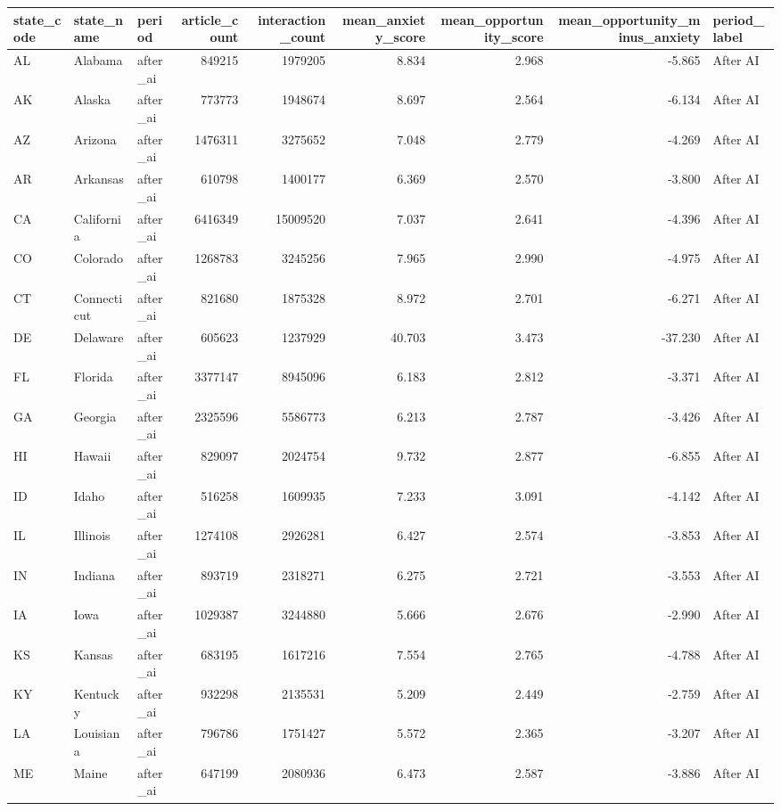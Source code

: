\begin{tabular}{lllrrrrrl}
\toprule
state\_code & state\_name & period & article\_count & interaction\_count & mean\_anxiety\_score & mean\_opportunity\_score & mean\_opportunity\_minus\_anxiety & period\_label \\
\midrule
AL & Alabama & after\_ai & 849215 & 1979205 & 8.834 & 2.968 & -5.865 & After AI \\
AK & Alaska & after\_ai & 773773 & 1948674 & 8.697 & 2.564 & -6.134 & After AI \\
AZ & Arizona & after\_ai & 1476311 & 3275652 & 7.048 & 2.779 & -4.269 & After AI \\
AR & Arkansas & after\_ai & 610798 & 1400177 & 6.369 & 2.570 & -3.800 & After AI \\
CA & California & after\_ai & 6416349 & 15009520 & 7.037 & 2.641 & -4.396 & After AI \\
CO & Colorado & after\_ai & 1268783 & 3245256 & 7.965 & 2.990 & -4.975 & After AI \\
CT & Connecticut & after\_ai & 821680 & 1875328 & 8.972 & 2.701 & -6.271 & After AI \\
DE & Delaware & after\_ai & 605623 & 1237929 & 40.703 & 3.473 & -37.230 & After AI \\
FL & Florida & after\_ai & 3377147 & 8945096 & 6.183 & 2.812 & -3.371 & After AI \\
GA & Georgia & after\_ai & 2325596 & 5586773 & 6.213 & 2.787 & -3.426 & After AI \\
HI & Hawaii & after\_ai & 829097 & 2024754 & 9.732 & 2.877 & -6.855 & After AI \\
ID & Idaho & after\_ai & 516258 & 1609935 & 7.233 & 3.091 & -4.142 & After AI \\
IL & Illinois & after\_ai & 1274108 & 2926281 & 6.427 & 2.574 & -3.853 & After AI \\
IN & Indiana & after\_ai & 893719 & 2318271 & 6.275 & 2.721 & -3.553 & After AI \\
IA & Iowa & after\_ai & 1029387 & 3244880 & 5.666 & 2.676 & -2.990 & After AI \\
KS & Kansas & after\_ai & 683195 & 1617216 & 7.554 & 2.765 & -4.788 & After AI \\
KY & Kentucky & after\_ai & 932298 & 2135531 & 5.209 & 2.449 & -2.759 & After AI \\
LA & Louisiana & after\_ai & 796786 & 1751427 & 5.572 & 2.365 & -3.207 & After AI \\
ME & Maine & after\_ai & 647199 & 2080936 & 6.473 & 2.587 & -3.886 & After AI \\

\end{tabular}
